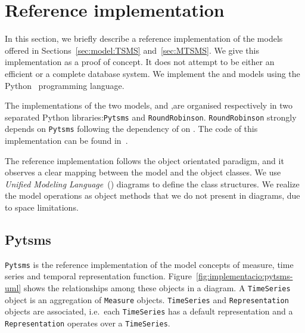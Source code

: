 \section{Reference implementation}
\label{sec:implementation}

In this section, we briefly describe a reference implementation of the
models offered in Sections~\ref{sec:model:TSMS} and~\ref{sec:MTSMS}. We
give this implementation as a proof of concept. It does not attempt to
be either an efficient or a complete database system. We implement the
 and  models using the
Python~\cite{python:doc2} programming language.

The implementations of the two models,  and
,are organised respectively in two separated Python
libraries:\texttt{Pytsms} and \texttt{RoundRobinson}.
\texttt{RoundRobinson} strongly depends on \texttt{Pytsms} following
the dependency of on .  The code of this
implementation can be found in~\cite{llusa:roundrobinson}.

The reference implementation follows the object orientated paradigm,
and it observes a clear mapping between the model and the object
classes. We use \emph{Unified Modeling Language}~() diagrams
to define the class structures. We realize the model operations as
object methods that we do not present in  diagrams, due to
space limitations.


\subsection{Pytsms}

\texttt{Pytsms} is the reference implementation of the model concepts
of measure, time series and temporal representation function.
Figure~\ref{fig:implementacio:pytsms-uml} shows the relationships
among these objects in a  diagram. A \texttt{TimeSeries}
object is an aggregation of \texttt{Measure}
objects. \texttt{TimeSeries} and \texttt{Representation} objects are
associated, i.e.\ each \texttt{TimeSeries} has a default
representation and a \texttt{Representation} operates over a
\texttt{TimeSeries}.

